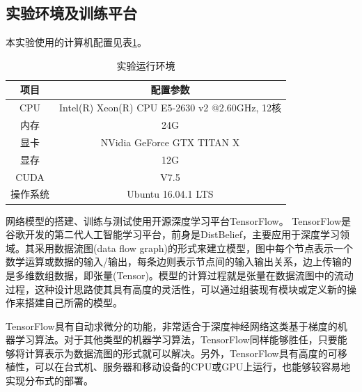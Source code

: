 \subsection{实验环境及训练平台}
本实验使用的计算机配置见表\ref{tab:3_3_experiment_environment}。
\begin{table}[htbp]
	\centering
	\caption{实验运行环境} \label{tab:3_3_experiment_environment}
	\begin{small} %
		\begin{tabular}{|c|c|}\hline
			项目  & 配置参数  \\\hline
			CPU & Intel(R) Xeon(R) CPU E5-2630 v2 @2.60GHz, 12核 \\
			内存 & 24G \\
			显卡 & NVidia GeForce GTX TITAN X \\
			显存 & 12G \\
			CUDA & V7.5 \\
			操作系统 & Ubuntu 16.04.1 LTS \\\hline
		\end{tabular}
	\end{small} %
\end{table}

网络模型的搭建、训练与测试使用开源深度学习平台TensorFlow\cite{abadi2016tensorflow}。
TensorFlow是谷歌开发的第二代人工智能学习平台，前身是DistBelief，主要应用于深度学习领域。其采用数据流图(data flow graph)的形式来建立模型，图中每个节点表示一个数学运算或数据的输入/输出，每条边则表示节点间的输入输出关系，边上传输的是多维数组数据，即张量(Tensor)。模型的计算过程就是张量在数据流图中的流动过程，这种设计思路使其具有高度的灵活性，可以通过组装现有模块或定义新的操作来搭建自己所需的模型。

TensorFlow具有自动求微分的功能，非常适合于深度神经网络这类基于梯度的机器学习算法。对于其他类型的机器学习算法，TensorFlow同样能够胜任，只要能够将计算表示为数据流图的形式就可以解决。另外，TensorFlow具有高度的可移植性，可以在台式机、服务器和移动设备的CPU或GPU上运行，也能够较容易地实现分布式的部署。

